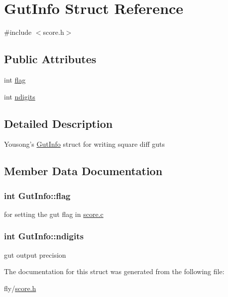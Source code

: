 \hypertarget{structGutInfo}{
\section{GutInfo Struct Reference}
\label{structGutInfo}
}


{\ttfamily \#include $<$score.h$>$}\subsection*{Public Attributes}
\begin{DoxyCompactItemize}
\item 
int \hyperlink{structGutInfo_a0e6129c1c8fb4283e19f75387867b94e}{flag}
\item 
int \hyperlink{structGutInfo_adada774cae361f8adb0c311aec024290}{ndigits}
\end{DoxyCompactItemize}


\subsection{Detailed Description}
Yousong's \hyperlink{structGutInfo}{GutInfo} struct for writing square diff guts 

\subsection{Member Data Documentation}
\hypertarget{structGutInfo_a0e6129c1c8fb4283e19f75387867b94e}{
\subsubsection[{flag}]{\setlength{\rightskip}{0pt plus 5cm}int {\bf GutInfo::flag}}}
\label{structGutInfo_a0e6129c1c8fb4283e19f75387867b94e}
for setting the gut flag in \hyperlink{score_8c}{score.c} \hypertarget{structGutInfo_adada774cae361f8adb0c311aec024290}{
\subsubsection[{ndigits}]{\setlength{\rightskip}{0pt plus 5cm}int {\bf GutInfo::ndigits}}}
\label{structGutInfo_adada774cae361f8adb0c311aec024290}
gut output precision 

The documentation for this struct was generated from the following file:\begin{DoxyCompactItemize}
\item 
fly/\hyperlink{score_8h}{score.h}\end{DoxyCompactItemize}
